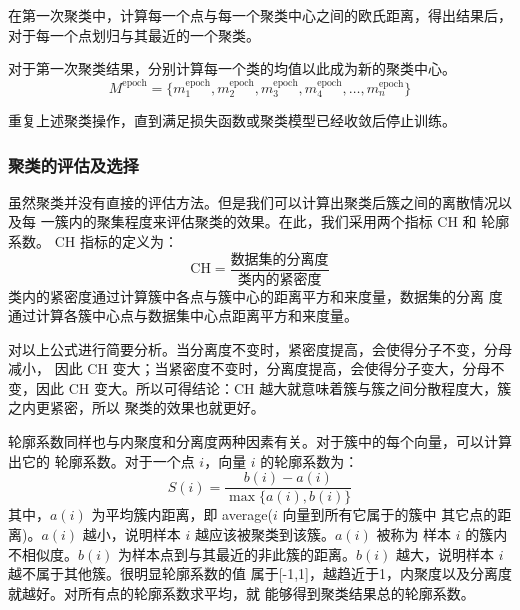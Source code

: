 \documentclass[withoutpreface,bwprint]{cumcmthesis} %
\begin{document}
在第一次聚类中，计算每一个点与每一个聚类中心之间的欧氏距离，得出结果后，
对于每一个点划归与其最近的一个聚类。

对于第一次聚类结果，分别计算每一个类的均值以此成为新的聚类中心。
\[
    M^{\mathrm{epoch}}=\{m_1^{\mathrm{epoch}},m_2^{\mathrm{epoch}},
    m_3^{\mathrm{epoch}},m_4^{\mathrm{epoch}},\dots,m_n^{\mathrm{epoch}}\}
\]

重复上述聚类操作，直到满足损失函数或聚类模型已经收敛后停止训练。



\subsubsection{聚类的评估及选择}
虽然聚类并没有直接的评估方法。但是我们可以计算出聚类后簇之间的离散情况以及每
一簇内的聚集程度来评估聚类的效果。在此，我们采用两个指标 CH 和 轮廓系数。
CH 指标的定义为：
\[
    \mathrm{CH} = \frac{\text{数据集的分离度}}{\text{类内的紧密度}}
\]
\indent 类内的紧密度通过计算簇中各点与簇中心的距离平方和来度量，数据集的分离
度通过计算各簇中心点与数据集中心点距离平方和来度量。

对以上公式进行简要分析。当分离度不变时，紧密度提高，会使得分子不变，分母减小，
因此 CH 变大；当紧密度不变时，分离度提高，会使得分子变大，分母不变，因此 CH
变大。所以可得结论：CH 越大就意味着簇与簇之间分散程度大，簇之内更紧密，所以
聚类的效果也就更好。

轮廓系数同样也与内聚度和分离度两种因素有关。对于簇中的每个向量，可以计算出它的
轮廓系数。对于一个点 $i$，向量 $i$ 的轮廓系数为：
\[
    S(i)=\frac{b(i)-a(i)}{\max\{a(i),b(i)\}}
\]
\indent 其中，$a(i)$ 为平均簇内距离，即 average($i$ 向量到所有它属于的簇中
其它点的距离)。$a(i)$ 越小，说明样本 $i$ 越应该被聚类到该簇。$a(i)$ 被称为
样本 $i$ 的簇内不相似度。$b(i)$ 为样本点到与其最近的非此簇的距离。$b(i)$ 
越大，说明样本 $i$ 越不属于其他簇。很明显轮廓系数的值
属于[-1,1]，越趋近于1，内聚度以及分离度就越好。对所有点的轮廓系数求平均，就
能够得到聚类结果总的轮廓系数。
\end{document}
